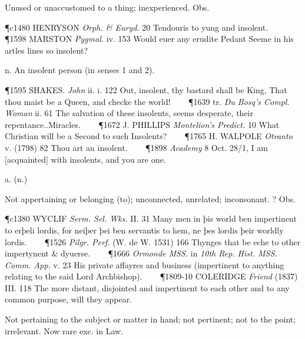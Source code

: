 \begin{description}[wide, labelwidth=!, labelindent=0pt]
\begin{myenumerate}
 Unused or unaccustomed to a thing; inexperienced. Obs.

\P c1480 HENRYSON  \textit{Orph. \& Euryd.} 20 Tendouris to yung and insolent.    
\P 1598 MARSTON  \textit{Pygmal.} iv. 153 Would euer any erudite Pedant Seeme in his artles lines so insolent?

 n. An insolent person (in senses 1 and 2).

\P 1595 SHAKES.  \textit{John} ii. i. 122 Out, insolent, thy bastard shall be King, That thou maist be a Queen, and checke the world!    
\P 1639 tr.  \textit{Du Bosq's Compl. Woman} ii. 61 The salvation of these insolents, seems desperate, their repentance..Miracles.    
\P 1672 J. PHILLIPS  \textit{Montelion's Predict.} 10 What Christian will be a Second to such Insolents?    
\P 1765 H. WALPOLE  \textit{Otranto} v. (1798) 82 Thou art an insolent.    
\P 1898 \textit{Academy}  8 Oct. 28/1, I am [acquainted] with insolents, and you are one.
\end{myenumerate}


 a. (n.)

\noindent {}

\vspace{-0.3cm}

\begin{myenumerate}

 Not appertaining or belonging (to); unconnected, unrelated; inconsonant. ? Obs.

\P c1380 WYCLIF  \textit{Serm. Sel. Wks.} II. 31 Many men in þis world ben impertinent to erþeli lordis, for neiþer þei ben servantis to hem, ne þes lordis þeir worldly lordis.    
\P 1526  \textit{Pilgr. Perf.} (W. de W. 1531) 166 Thynges that be eche to other impertynent \& dyuerse.    
\P 1666 \textit{Ormonde MSS.} in  \textit{10th Rep. Hist. MSS. Comm. App.} v. 23 His private affayres and business (impertinent to anything relating to the said Lord Archbishop).    
\P 1809-10 COLERIDGE  \textit{Friend} (1837) III. 118 The more distant, disjointed and impertinent to each other and to any common purpose, will they appear.

 Not pertaining to the subject or matter in hand; not pertinent; not to the point; irrelevant. Now rare exc. in Law.


\end{myenumerate}
\end{description}
